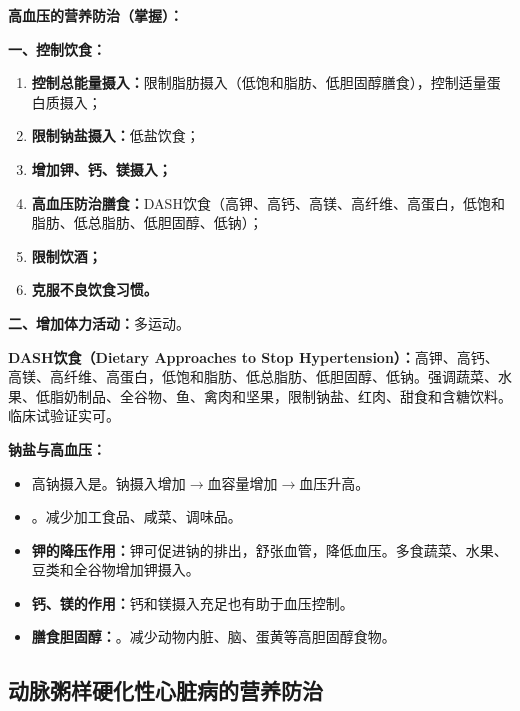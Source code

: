 \begin{keybox}
\textbf{高血压的营养防治（掌握）：}

\textbf{一、控制饮食：}
\begin{enumerate}[leftmargin=*]
    \item \textbf{控制总能量摄入：}限制脂肪摄入（低饱和脂肪、低胆固醇膳食），控制适量蛋白质摄入；
    \item \textbf{限制钠盐摄入：}低盐饮食；
    \item \textbf{增加钾、钙、镁摄入；}
    \item \textbf{高血压防治膳食：}DASH饮食（高钾、高钙、高镁、高纤维、高蛋白，低饱和脂肪、低总脂肪、低胆固醇、低钠）；
    \item \textbf{限制饮酒；}
    \item \textbf{克服不良饮食习惯。}
\end{enumerate}

\textbf{二、增加体力活动：}多运动。
\end{keybox}

\begin{defbox}
\textbf{DASH饮食（Dietary Approaches to Stop Hypertension）：}高钾、高钙、高镁、高纤维、高蛋白，低饱和脂肪、低总脂肪、低胆固醇、低钠。强调蔬菜、水果、低脂奶制品、全谷物、鱼、禽肉和坚果，限制钠盐、红肉、甜食和含糖饮料。临床试验证实可。
\end{defbox}

\begin{defbox}
\textbf{钠盐与高血压：}
\begin{itemize}[leftmargin=*]
    \item 高钠摄入是。钠摄入增加$\rightarrow$血容量增加$\rightarrow$血压升高。
    \item {}。减少加工食品、咸菜、调味品。
    \item \textbf{钾的降压作用：}钾可促进钠的排出，舒张血管，降低血压。多食蔬菜、水果、豆类和全谷物增加钾摄入。
    \item \textbf{钙、镁的作用：}钙和镁摄入充足也有助于血压控制。
    \item \textbf{膳食胆固醇：}。减少动物内脏、脑、蛋黄等高胆固醇食物。
\end{itemize}
\end{defbox}

\subsection{动脉粥样硬化性心脏病的营养防治}

